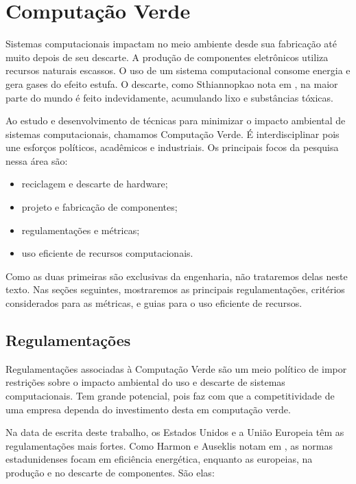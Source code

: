 \chapter{Computação Verde}
\label{cap:computacaoverde}

Sistemas computacionais impactam no meio ambiente desde sua fabricação até muito depois de seu descarte. A produção de componentes eletrônicos utiliza recursos naturais escassos. O uso de um sistema computacional consome energia e gera gases do efeito estufa. O descarte, como Sthiannopkao nota em \cite{sthiannopkao2013handling}, na maior parte do mundo é feito indevidamente, acumulando lixo e substâncias tóxicas.

Ao estudo e desenvolvimento de técnicas para minimizar o impacto ambiental de sistemas computacionais, chamamos Computação Verde. É interdisciplinar pois une esforços políticos, acadêmicos e industriais. Os principais focos da pesquisa nessa área são:

\begin{itemize}
    \item reciclagem e descarte de hardware;
    \item projeto e fabricação de componentes;
    \item regulamentações e métricas;
    \item uso eficiente de recursos computacionais.
\end{itemize}

Como as duas primeiras são exclusivas da engenharia, não trataremos delas neste texto. Nas seções seguintes, mostraremos as principais regulamentações, critérios considerados para as métricas, e guias para o uso eficiente de recursos.

\section{Regulamentações}
\mbox{}

Regulamentações associadas à Computação Verde são um meio político de impor restrições sobre o impacto ambiental do uso e descarte de sistemas computacionais. Tem grande potencial, pois faz com que a competitividade de uma empresa dependa do investimento desta em computação verde.

Na data de escrita deste trabalho, os Estados Unidos e a União Europeia têm as regulamentações mais fortes. Como Harmon e Auseklis notam em \cite{harmon2009sustainable}, as normas estadunidenses focam em eficiência energética, enquanto as europeias, na produção e no descarte de componentes. São elas:

